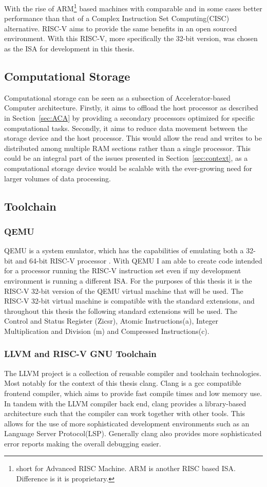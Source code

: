 With the rise of ARM\footnote{short for Advanced RISC Machine. ARM is another
RISC based ISA. Difference is it is proprietary.} based machines with comparable
and in some cases better performance than that of a Complex Instruction Set
Computing(CISC) alternative.\cite{Power_Struggle} RISC-V aims to provide the
same benefits in an open sourced environment. With this RISC-V, more
specifically the 32-bit version, was chosen as the ISA for development in this
thesis.

\subsection{Computational Storage}
Computational storage can be seen as a subsection of Accelerator-based Computer
architecture. Firstly, it aims to offload the host processor as described in
Section~\ref{sec:ACA} by providing a secondary processors optimized for specific
computational tasks. Secondly, it aims to reduce data movement between the
storage device and the host processor. This would allow the read and writes to
be distributed among multiple RAM sections rather than a single processor. This
could be an integral part of the issues presented in Section~\ref{sec:context},
as a computational storage device would be scalable with the ever-growing need
for larger volumes of data processing.


\subsection{Toolchain}
\subsubsection*{QEMU}
QEMU is a system emulator, which has the capabilities of emulating both a 32-bit
and 64-bit RISC-V processor \cite{QEMU}. With QEMU I am able to create code
intended for a processor running the RISC-V instruction set even if my
development environment is running a different ISA. For the purposes of this
thesis it is the RISC-V 32-bit version of the QEMU virtual machine that will be
used. The RISC-V 32-bit virtual machine is compatible with the standard
extensions, and throughout this thesis the following standard extensions will be
used. The Control and Status Register (Zicsr), Atomic Instructions(a), Integer
Multiplication and Division (m) and Compressed Instructions(c).

\subsubsection*{LLVM and RISC-V GNU Toolchain}
The LLVM project is a collection of reusable compiler and toolchain
technologies. Most notably for the context of this thesis clang. Clang is a gcc
compatible frontend compiler, which aims to provide fast compile times and low
memory use. In tandem with the LLVM compiler back end, clang provides a
library-based architecture such that the compiler can work together with other
tools. This allows for the use of more sophisticated development environments
such as an Language Server Protocol(LSP). Generally clang also provides more
sophisticated error reports making the overall debugging easier.

